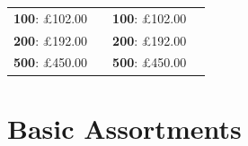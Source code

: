 \documentclass[11pt, english]{article}
\begin{document}
\begin{table}[h]
\begin{center}
\begin{tabular}{r|p{4cm}r|p{4cm}}
		\textbf{100}: \pounds102.00 & & \textbf{100}: \pounds102.00 & \\
		\textbf{200}: \pounds192.00 & & \textbf{200}: \pounds192.00 & \\
		\textbf{500}: \pounds450.00 & & \textbf{500}: \pounds450.00 & \\
	\end{tabular}
	\end{center}
	\end{table}

\newpage

\section{Basic Assortments}
\end{document}
